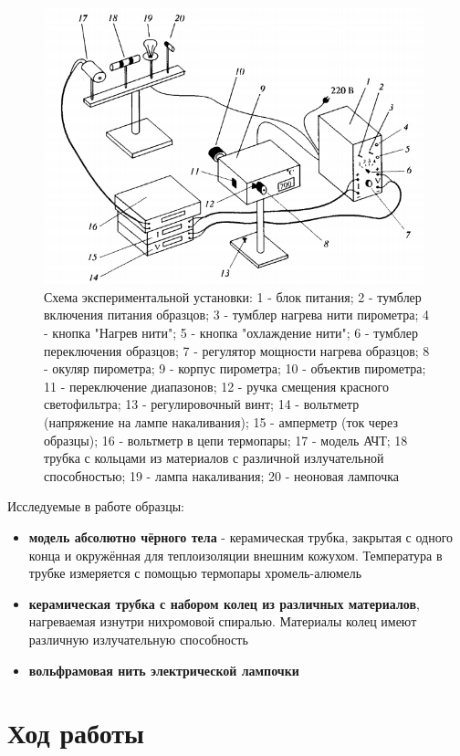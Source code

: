 \documentclass[a4paper,12pt]{article} %
\begin{document}
		\begin{figure}[h]
			\centering
			\includegraphics[width=11cm]{img/fig1.PNG}
			\caption{Схема экспериментальной установки: 1 - блок питания; 2 - тумблер включения питания образцов; 3 - тумблер нагрева нити пирометра; 4 - кнопка "Нагрев нити"; 5 - кнопка "охлаждение нити"; 6 - тумблер переключения образцов; 7 - регулятор мощности нагрева образцов; 8 - окуляр пирометра; 9 - корпус пирометра; 10 - объектив пирометра; 11 - переключение диапазонов; 12 - ручка смещения красного светофильтра; 13 - регулировочный винт; 14 - вольтметр (напряжение на лампе накаливания); 15 - амперметр (ток через образцы); 16 - вольтметр в цепи термопары; 17 - модель АЧТ; 18 трубка с кольцами из материалов с различной излучательной способностью; 19 - лампа накаливания; 20 - неоновая лампочка}
			\label{fig2}
		\end{figure}
		Исследуемые в работе образцы:
		\begin{itemize}
			\item \textbf{модель абсолютно чёрного тела} - керамическая трубка, закрытая с одного конца и окружённая для теплоизоляции внешним кожухом. Температура в трубке измеряется с помощью термопары хромель-алюмель
			\item \textbf{керамическая трубка с набором колец из различных материалов}, нагреваемая изнутри нихромовой спиралью. Материалы колец имеют различную излучательную способность
			\item \textbf{вольфрамовая нить электрической лампочки}
		\end{itemize}
	\newpage


	\section{Ход работы}
\end{document}
